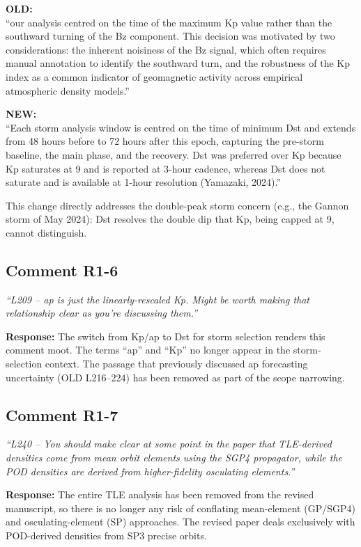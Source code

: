 \documentclass[11pt]{article}
\newcommand{\reviewercomment}[1]{%
  \medskip
  \noindent\textit{\color{reviewblue}#1}%
  \medskip
}
\newcommand{\oldtext}[1]{%
  \smallskip
  \noindent\hspace{1em}\begin{minipage}{0.92\textwidth}%
  \color{quotegray}\textbf{OLD:}\\[2pt]``#1''%
  \end{minipage}%
  \smallskip
}
\newcommand{\newtext}[1]{%
  \smallskip
  \noindent\hspace{1em}\begin{minipage}{0.92\textwidth}%
  \color{quotegreen}\textbf{NEW:}\\[2pt]``#1''%
  \end{minipage}%
  \smallskip
}
\begin{document}
\oldtext{our analysis centred on the time of the maximum Kp value rather than the southward turning of the Bz component. This decision was motivated by two considerations: the inherent noisiness of the Bz signal, which often requires manual annotation to identify the southward turn, and the robustness of the Kp index as a common indicator of geomagnetic activity across empirical atmospheric density models.}

\newtext{Each storm analysis window is centred on the time of minimum Dst and extends from 48 hours before to 72 hours after this epoch, capturing the pre-storm baseline, the main phase, and the recovery. Dst was preferred over Kp because Kp saturates at 9 and is reported at 3-hour cadence, whereas Dst does not saturate and is available at 1-hour resolution (Yamazaki, 2024).}

This change directly addresses the double-peak storm concern (e.g., the Gannon storm of May 2024): Dst resolves the double dip that Kp, being capped at 9, cannot distinguish.


\subsection{Comment R1-6}

\reviewercomment{%
``L209 -- ap is just the linearly-rescaled Kp. Might be worth making that relationship clear as you're discussing them.''}

\textbf{Response:}
The switch from Kp/ap to Dst for storm selection renders this comment moot. The terms ``ap'' and ``Kp'' no longer appear in the storm-selection context. The passage that previously discussed ap forecasting uncertainty (OLD L216--224) has been removed as part of the scope narrowing.


\subsection{Comment R1-7}

\reviewercomment{%
``L240 -- You should make clear at some point in the paper that TLE-derived densities come from mean orbit elements using the SGP4 propagator, while the POD densities are derived from higher-fidelity osculating elements.''}

\textbf{Response:}
The entire TLE analysis has been removed from the revised manuscript, so there is no longer any risk of conflating mean-element (GP/SGP4) and osculating-element (SP) approaches. The revised paper deals exclusively with POD-derived densities from SP3 precise orbits.
\end{document}
